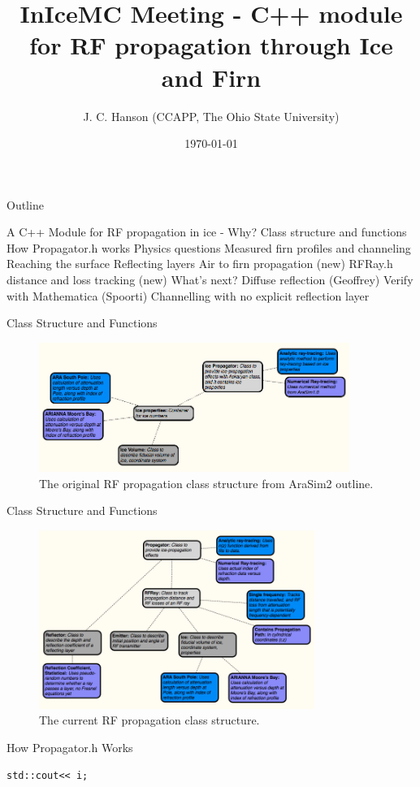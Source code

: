 \documentclass{beamer}
\title{InIceMC Meeting - C++ module for RF propagation through Ice and Firn}
\date{\today}
\author{J. C. Hanson (CCAPP, The Ohio State University)}
\institute{CCAPP @ OSU}
\begin{document}
 \maketitle
\small

\begin{frame}{Outline}
\begin{outline}[enumerate]
\1 A C++ Module for RF propagation in ice - Why?
\2 Class structure and functions
\2 How Propagator.h works
\1 Physics questions
\2 Measured firn profiles and channeling
\2 Reaching the surface
\2 Reflecting layers
\2 Air to firn propagation (new)
\2 RFRay.h distance and loss tracking (new)
\1 What's next?
\2 Diffuse reflection (Geoffrey)
\2 Verify with Mathematica (Spoorti)
\2 Channelling with no explicit reflection layer
\end{outline}
\end{frame}

\begin{frame}{Class Structure and Functions}
\begin{figure}
\begin{center}
\includegraphics[width=0.9\textwidth]{figures/Propagation.png}
\caption{\label{fig:fig1} The original RF propagation class structure from AraSim2 outline.}
\end{center}
\end{figure}
\end{frame}

\begin{frame}{Class Structure and Functions}
\begin{figure}
\begin{center}
\includegraphics[width=0.8\textwidth]{figures/Propagation2.png}
\caption{\label{fig:fig2} The current RF propagation class structure.}
\end{center}
\end{figure}
\end{frame}

\begin{frame}{How Propagator.h Works}
\begin{verbatim}
std::cout<< i;
\end{verbatim}
\end{frame}
\end{document}
